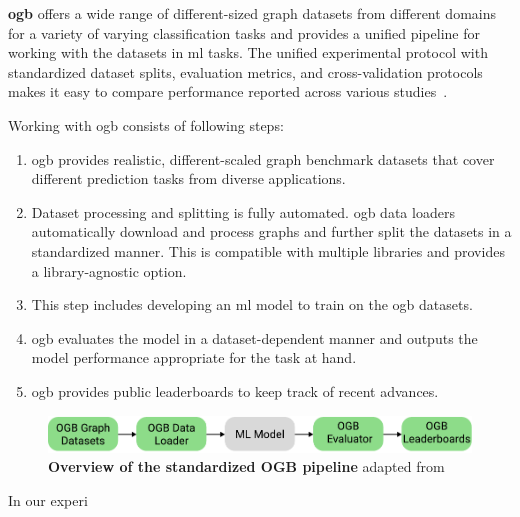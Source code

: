 \textbf{\Ac{ogb}} offers a wide range of different-sized graph datasets from different domains for a variety of varying classification tasks and provides a unified pipeline for working with the datasets in \ac{ml} tasks.
The unified experimental protocol with standardized dataset splits, evaluation metrics, and cross-validation protocols makes it easy to compare performance reported across various studies~\cite{Hu2020}.

Working with \ac{ogb} consists of following steps:

\begin{enumerate}
    \item \Ac{ogb} provides realistic, different-scaled graph benchmark datasets that cover different prediction tasks from diverse applications.
    \item Dataset processing and splitting is fully automated. \Ac{ogb} data loaders automatically download and process graphs and further split the datasets in a standardized manner. This is compatible with multiple libraries and provides a library-agnostic option.
    \item This step includes developing an \ac{ml} model to train on the \ac{ogb} datasets.
    \item  \Ac{ogb} evaluates the model in a dataset-dependent manner and outputs the model performance appropriate for the task at hand.
    \item \Ac{ogb} provides public leaderboards to keep track of recent advances.
\end{enumerate}

\begin{figure}[H]
    \centering
    \includegraphics[width= 0.90\linewidth]{gfx/implementation/OGB_pipeline}
    \caption{\textbf{Overview of the standardized OGB pipeline} adapted from \cite{Hu2020}}\label{fig:implement:pipeline}
\end{figure}






In our experi